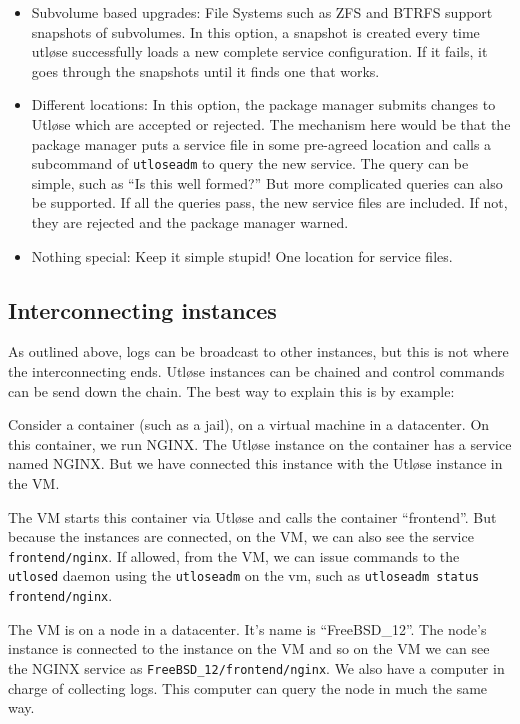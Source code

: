 \documentclass{article}
\begin{document}
\begin{itemize}
  \item{Subvolume based upgrades: File Systems such as ZFS and BTRFS support snapshots of subvolumes. In this option, a snapshot is created
    every time utløse successfully loads a new complete service configuration. If it fails, it goes through the snapshots until it finds one that
    works.}
  \item{Different locations: In this option, the package manager submits changes to Utløse which are accepted or rejected. The mechanism here would be
    that the package manager puts a service file in some pre-agreed location and calls a subcommand of \texttt{utloseadm} to query the new service.
    The query can be simple, such as ``Is this well formed?'' But more complicated queries can also be supported. If all the queries pass, the new service
    files are included. If not, they are rejected and the package manager warned.}
  \item{Nothing special: Keep it simple stupid! One location for service files.}
\end{itemize}

\subsection{Interconnecting instances}
As outlined above, logs can be broadcast to other instances, but this is not where the interconnecting ends. Utløse instances
can be chained and control commands can be send down the chain. The best way to explain this is by example:

Consider a container (such as a jail), on a virtual machine in a datacenter. On this container, we run NGINX.
The Utløse instance on the container has a service named NGINX. But we have connected this instance with the Utløse instance
in the VM.

The VM starts this container via Utløse and calls the container ``frontend''. But because the instances are connected,
on the VM, we can also see the service \texttt{frontend/nginx}. If allowed, from the VM, we can issue commands to the \texttt{utlosed}
daemon using the \texttt{utloseadm} on the vm, such as \texttt{utloseadm status frontend/nginx}.

The VM is on a node in a datacenter. It's name is ``FreeBSD\_12''. The node's instance is connected to the instance on the VM and so
on the VM we can see the NGINX service as \texttt{FreeBSD\_12/frontend/nginx}. We also have a computer in charge of collecting logs.
This computer can query the node in much the same way.
\end{document}
